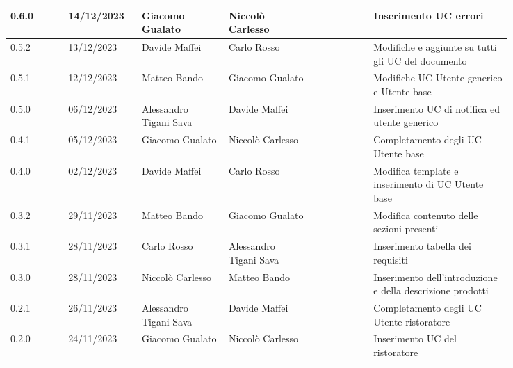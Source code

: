 {\begin{longtable}{p{0.10\linewidth}p{0.10\linewidth}p{0.15\linewidth}p{0.15\linewidth}p{0.10\linewidth}p{0.24\linewidth}}
	  \hline
	  0.6.0             & 14/12/2023    & Giacomo Gualato        & Niccolò Carlesso       &                        & Inserimento UC errori                                                    \\
	  \hline
	  0.5.2             & 13/12/2023    & Davide Maffei          & Carlo Rosso            &                        & Modifiche e aggiunte su tutti gli UC del documento                       \\
	  \hline
	  0.5.1             & 12/12/2023    & Matteo Bando           & Giacomo Gualato        &                        & Modifiche UC Utente generico e Utente base                               \\
	  \hline
	  0.5.0             & 06/12/2023    & Alessandro Tigani Sava & Davide Maffei          &                        & Inserimento UC di notifica ed utente generico                            \\
	  \hline
	  0.4.1             & 05/12/2023    & Giacomo Gualato        & Niccolò Carlesso       &                        & Completamento degli UC Utente base                                       \\
	  \hline
	  0.4.0             & 02/12/2023    & Davide Maffei          & Carlo Rosso            &                        & Modifica template e inserimento di UC Utente base                        \\
	  \hline
	  0.3.2             & 29/11/2023    & Matteo Bando           & Giacomo Gualato        &                        & Modifica contenuto delle sezioni presenti                                \\
	  \hline
	  0.3.1             & 28/11/2023    & Carlo Rosso            & Alessandro Tigani Sava &                        & Inserimento tabella dei requisiti                                        \\
	  \hline
	  0.3.0             & 28/11/2023    & Niccolò Carlesso       & Matteo Bando           &                        & Inserimento dell'introduzione e della descrizione prodotti               \\
	  \hline
	  0.2.1             & 26/11/2023    & Alessandro Tigani Sava & Davide Maffei          &                        & Completamento degli UC Utente ristoratore                                \\
	  \hline
	  0.2.0             & 24/11/2023    & Giacomo Gualato        & Niccolò Carlesso       &                        & Inserimento UC del ristoratore                                           \\

\end{longtable}}
